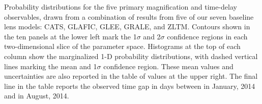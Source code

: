 Probability distributions for the five primary magnification and
time-delay observables, drawn from a combination of results from five
of our seven baseline lens models: CATS, GLAFIC, GLEE, GRALE, and
ZLTM.  Contours shown in the ten panels at the lower left mark the
1$\sigma$ and 2$\sigma$ confidence regions in each two-dimensional
slice of the parameter space. Histograms at the top of each column
show the marginalized 1-D probability distributions, with
dashed vertical lines marking the mean and 1$\sigma$ confidence
region.  These mean values and uncertainties are also reported in the
table of values at the upper right. The final line in the table
reports the observed time gap in days between \spockone in January,
2014 and \spocktwo in August, 2014.
\label{fig:LensModelContours}
